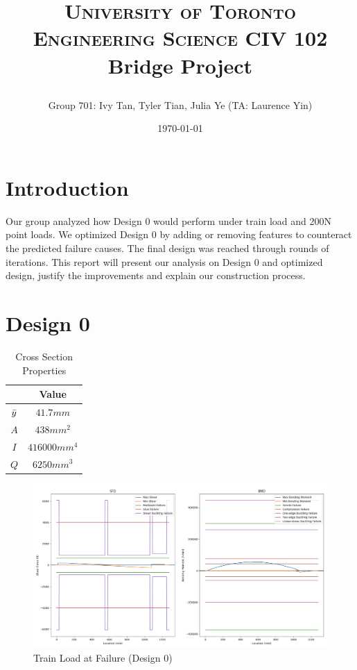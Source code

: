 \documentclass[11pt,twocolumn,letterpaper]{article}
\title{
		\usefont{OT1}{bch}{b}{n}
		\normalfont \normalsize \textsc{University of Toronto Engineering Science CIV 102} \\ [11pt]
		\huge Bridge Project  \\
        
\selectlanguage{english}
\author{Group 701: Ivy Tan, Tyler Tian, Julia Ye (TA: Laurence Yin)}
\date{\today}
}
\begin{document}
\singlespacing
\maketitle

\section*{Introduction}
Our group analyzed how Design 0 would perform under train load and 200N point loads. We optimized Design 0 by adding or removing features to counteract the predicted failure causes. The final design was reached through rounds of iterations. This report will present our analysis on Design 0 and optimized design, justify the improvements and explain our construction process.

\section*{Design 0}
\vspace{-1em}
\begin{table}[h]
\begin{center}
\begin{tabular}{|cc|} 
\hline
\multicolumn{1}{|c}{} & \multicolumn{1}{c|}{Value} \\
\hline
$\Bar{y}$ &   $41.7\si{mm}$ \\
$A$ &   $438\si{mm^2}$ \\
$I$ &   $416000\si{mm^4}$ \\
$Q$ &   $6250\si{mm^3}$ \\
\hline
\end{tabular}
\caption{Cross Section Properties}
\end{center}
\end{table}
\begin{figure}[h]
  \centering
    \includegraphics[width=.4\textwidth]{figures/S,BTrainFailure.png}
    \caption {Train Load at Failure (Design 0)}
    \label{fig:design0_train}
  \hfill
\end{figure}
\end{document}
